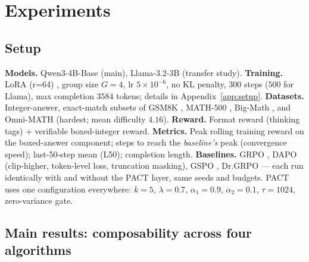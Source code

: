 \documentclass{article} %
\theoremstyle{plain}
\theoremstyle{definition}
\theoremstyle{remark}
\newcommand{\method}{PACT}
\begin{document}
\section{Experiments}
\label{sec:experiments}

\subsection{Setup}
\label{sec:setup}

\textbf{Models.} Qwen3-4B-Base (main), Llama-3.2-3B (transfer study). \textbf{Training.} LoRA (r=64) \citep{hu2022lora}, group size $G{=}4$, lr $5{\times}10^{-6}$, no KL penalty, $300$ steps ($500$ for Llama), max completion $3584$ tokens; details in Appendix~\ref{app:setup}. \textbf{Datasets.} Integer-answer, exact-match subsets of GSM8K \citep{cobbe2021gsm8k}, MATH-500 \citep{hendrycks2021math}, Big-Math \citep{albalak2025bigmath}, and Omni-MATH \citep{gao2024omnimath} (hardest; mean difficulty $4.16$). \textbf{Reward.} Format reward (thinking tags) + verifiable boxed-integer reward. \textbf{Metrics.} Peak rolling training reward on the boxed-answer component; steps to reach the \emph{baseline's} peak (convergence speed); last-50-step mean (L50); completion length. \textbf{Baselines.} GRPO \citep{shao2024deepseekmath}, DAPO \citep{yu2025dapo} (clip-higher, token-level loss, truncation masking), GSPO \citep{zheng2025gspo}, Dr.GRPO \citep{liu2025drgrpo} --- each run identically with and without the \method{} layer, same seeds and budgets. \method{} uses one configuration everywhere: $k{=}5$, $\lambda{=}0.7$, $\alpha_1{=}0.9$, $\alpha_2{=}0.1$, $\tau{=}1024$, zero-variance gate.

\subsection{Main results: composability across four algorithms}
\label{sec:main-results}
\end{document}
